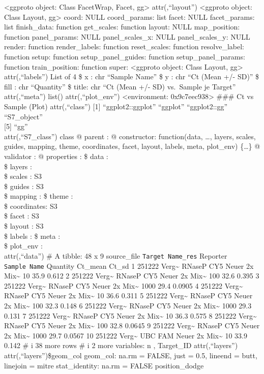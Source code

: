 \documentclass[
]{article}
\begin{document}
\textless ggproto object: Class FacetWrap, Facet, gg\textgreater{}
attr(,``layout'') \textless ggproto object: Class Layout,
gg\textgreater{} coord: NULL coord\_params: list facet: NULL
facet\_params: list finish\_data: function get\_scales: function layout:
NULL map\_position: function panel\_params: NULL panel\_scales\_x: NULL
panel\_scales\_y: NULL render: function render\_labels: function
reset\_scales: function resolve\_label: function setup: function
setup\_panel\_guides: function setup\_panel\_params: function
train\_position: function super: \textless ggproto object: Class Layout,
gg\textgreater{} attr(,``labels'') List of 4 \$ x : chr ``Sample Name''
\$ y : chr ``Ct (Mean +/- SD)'' \$ fill : chr ``Quantity'' \$ title: chr
``Ct (Mean +/- SD) vs.~Sample je Target'' attr(,``meta'') list()
attr(,``plot\_env'') \textless environment: 0x9c7eec938\textgreater{}
\n\#\#\# Ct vs Sample (Plot) \n\n attr(,``class'') {[}1{]}
``ggplot2::ggplot'' ``ggplot'' ``ggplot2::gg'' ``S7\_object''\\
{[}5{]} ``gg''\\
attr(,``S7\_class'') class @ parent : @ constructor: function(data,
\ldots, layers, scales, guides, mapping, theme, coordinates, facet,
layout, labels, meta, plot\_env) \{\ldots\} @ validator : @ properties :
\$ data : \\
\$ layers : \\
\$ scales : S3\\
\$ guides : S3\\
\$ mapping : \$ theme : \\
\$ coordinates: S3\\
\$ facet : S3\\
\$ layout : S3\\
\$ labels : \$ meta : \\
\$ plot\_env : \\
attr(,``data'') \# A tibble: 48 x 9 source\_file
\texttt{Target\ Name\_res} Reporter \texttt{Sample\ Name} Quantity
Ct\_mean Ct\_sd 1 251222 Verg\textasciitilde{} RNaseP CY5 Neuer 2x
Mix\textasciitilde{} 10 35.9 0.612 2 251222 Verg\textasciitilde{} RNaseP
CY5 Neuer 2x Mix\textasciitilde{} 100 32.6 0.395 3 251222
Verg\textasciitilde{} RNaseP CY5 Neuer 2x Mix\textasciitilde{} 1000 29.4
0.0905 4 251222 Verg\textasciitilde{} RNaseP CY5 Neuer 2x
Mix\textasciitilde{} 10 36.6 0.311 5 251222 Verg\textasciitilde{} RNaseP
CY5 Neuer 2x Mix\textasciitilde{} 100 32.3 0.148 6 251222
Verg\textasciitilde{} RNaseP CY5 Neuer 2x Mix\textasciitilde{} 1000 29.3
0.131 7 251222 Verg\textasciitilde{} RNaseP CY5 Neuer 2x
Mix\textasciitilde{} 10 36.3 0.575 8 251222 Verg\textasciitilde{} RNaseP
CY5 Neuer 2x Mix\textasciitilde{} 100 32.8 0.0645 9 251222
Verg\textasciitilde{} RNaseP CY5 Neuer 2x Mix\textasciitilde{} 1000 29.7
0.0567 10 251222 Verg\textasciitilde{} UBC FAM Neuer 2x
Mix\textasciitilde{} 10 33.9 0.142 \# i 38 more rows \# i 2 more
variables: n , Target\_ID attr(,``layers'') attr(,``layers'')\$geom\_col
geom\_col: na.rm = FALSE, just = 0.5, lineend = butt, linejoin = mitre
stat\_identity: na.rm = FALSE position\_dodge
\end{document}

